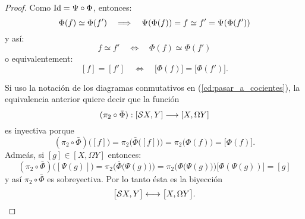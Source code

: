 \begin{proof}
Como $\text{Id}=\Psi\circ\Phi$, entonces:
\[
	\Phi(f)\simeq\Phi(f') \quad\Longrightarrow\quad \Psi(\Phi(f))=f\simeq f' =\Psi(\Phi(f'))
\]
y as\'i:
\[
	f\simeq f' \quad\iff\quad \Phi(f)\simeq\Phi(f')
\]
o equivalentement:
\[
	[f]=[f'] \quad\iff\quad \big[\Phi(f)\big]=\big[\Phi(f')\big].
\]

Si uso la notaci\'on de los diagramas conmutativos en (\ref{cd:pasar_a_cocientes}), la equivalencia
anterior quiere decir que la funci\'on
\[
	(\pi_2\circ\bar{\Phi}):[\mathcal{S} X,Y] \longrightarrow [X,\Omega Y]
\]
es inyectiva porque
\[
	(\pi_2\circ\bar{\Phi})\big( [f] \big)=
	\pi_2 \Big( \bar{\Phi} \big ( [f] \big) \Big)=
	\pi_2\big( \Phi(f) \big)=
	\big[\Phi(f)\big].
\]	
Adme\'as, si $[g]\in[X,\Omega Y]$ entonces:
\[
	(\pi_2\circ\bar{\Phi})\big( [\Psi(g)] \big)=
	\pi_2 \Big( \bar{\Phi}\big( \Psi(g) \big) \Big)=
	\pi_2 \Big( \Phi\big( \Psi(g)\big) \Big)
	\big[ \Phi(\Psi(g)) \big]=[g]
\]
y as\'i $\pi_2\circ\bar{\Phi}$ es sobreyectiva. Por lo tanto \'esta es la biyecci\'on
\[
	\big[\mathcal{S} X,Y\big] \longleftrightarrow	\big[X,\Omega Y\big].
\]
\end{proof}%

